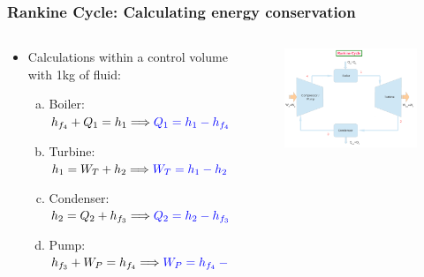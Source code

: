 \documentclass[10pt,compress]{beamer}
\begin{document}
\begin{frame}
 \frametitle{Rankine Cycle: Calculating energy conservation}
  \begin{columns}
   \begin{column}[c]{0.4\linewidth}
    \begin{itemize}
     \item <1-> Calculations within a control volume with 1kg of fluid:
      \begin{enumerate}[(a)] %
       \item <2->Boiler:\\
        $h_{f_{4}} + Q_{1} = h_{1} \Longrightarrow \textcolor{blue}{Q_{1}=h_{1}-h_{f_{4}}}$
       \item <3->Turbine:\\
        $h_{1} = W_{T} +h_{2} \Longrightarrow \textcolor{blue}{W_{T} =h_{1}-h_{2}}$
       \item <4->Condenser:\\
        $h_{2}=Q_{2}+h_{f_{3}} \Longrightarrow \textcolor{blue}{Q_{2}=h_{2}-h_{f_{3}}}$
       \item <5->Pump:\\
        $h_{f_{3}}+W_{P}=h_{f_{4}} \Longrightarrow \textcolor{blue}{W_{P}=h_{f_{4}}-h_{f_{3}}}$
      \end{enumerate}
     \end{itemize}
    \end{column}
    \begin{column}[c]{0.6\linewidth}
     \begin{figure}%
      \begin{center}
       \includegraphics[width=6.5cm,clip]{./Pics/Simple_Rankine_Cycle}
      \end{center}
     \end{figure}
    \end{column}
   \end{columns}
 \normalsize
\end{frame}
\end{document}
